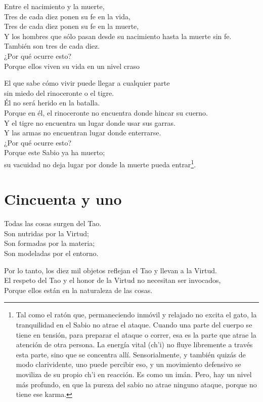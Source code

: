\documentclass[book,b5paper,hidelinks,final]{memoir}
\begin{document}
	Entre el nacimiento y la muerte,\\
	Tres de cada diez ponen su fe en la vida,\\
	Tres de cada diez ponen su fe en la muerte,\\
	Y los hombres que sólo pasan desde su nacimiento hasta la muerte sin
	fe.\\
	También son tres de cada diez.\\
	¿Por qué ocurre esto?\\
	Porque ellos viven su vida en un nivel craso
	
	El que sabe cómo vivir puede llegar a cualquier parte\\
	sin miedo del rinoceronte o el tigre.\\
	Él no será herido en la batalla.\\
	Porque en él, el rinoceronte no encuentra donde hincar su cuerno.\\
	Y el tigre no encuentra un lugar donde usar sus garras.\\
	Y las armas no encuentran lugar donde enterrarse.\\
	¿Por qué ocurre esto?\\
	Porque este Sabio ya ha muerto;\\
	su vacuidad no deja lugar por donde la muerte pueda entrar\footnote{Tal como el ratón que, permaneciendo inmóvil y relajado no excita el
		gato, la tranquilidad en el Sabio no atrae el ataque. Cuando una parte
		del cuerpo se tiene en tensión, para preparar el ataque o correr, esa es
		la parte que atrae la atención de otra persona. La energía vital (ch'i)
		no fluye libremente a través esta parte, sino que se concentra allí.
		Sensorialmente, y también quizás de modo clarividente, uno puede
		percibir eso, y un movimiento defensivo se moviliza de su propio ch'i en
		reacción. Es como un imán. Pero, hay un nivel más profundo, en que la
		pureza del sabio no atrae ninguno ataque, porque no tiene ese karma.}.
	
	\chapter*{Cincuenta y uno}
	
	Todas las cosas surgen del Tao.\\
	Son nutridas por la Virtud;\\
	Son formadas por la materia;\\
	Son modeladas por el entorno.
	
	Por lo tanto, los diez mil objetos reflejan el Tao y llevan a la
	Virtud.\\
	El respeto del Tao y el honor de la Virtud no necesitan ser invocados,\\
	Porque ellos están en la naturaleza de las cosas.
	
\end{document}
